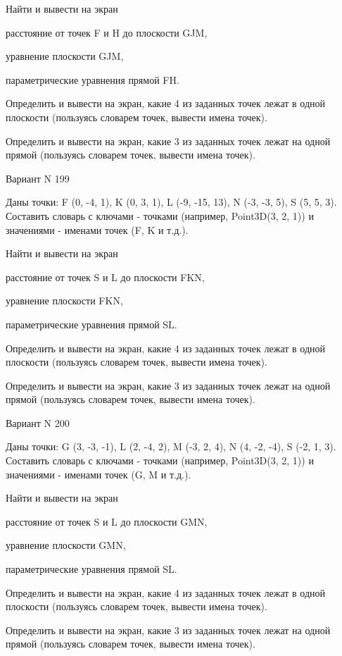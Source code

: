 \documentclass[11pt]{report}
\begin{document}
Найти и вывести на экран


расстояние от точек F и H до плоскости GJM,


уравнение плоскости GJM,


параметрические уравнения прямой FH.


Определить и вывести на экран, какие 4 из заданных точек лежат в одной плоскости (пользуясь словарем точек, вывести имена точек).


Определить и вывести на экран, какие 3 из заданных точек лежат на одной прямой (пользуясь словарем точек, вывести имена точек).

\newpage
Вариант N 199

Даны точки: F (0, -4, 1), K (0, 3, 1), L (-9, -15, 13), N (-3, -3, 5), S (5, 5, 3).
Составить словарь с ключами - точками (например, Point3D(3, 2, 1)) и значениями - именами точек (F, K и т.д.).


Найти и вывести на экран


расстояние от точек S и L до плоскости FKN,


уравнение плоскости FKN,


параметрические уравнения прямой SL.


Определить и вывести на экран, какие 4 из заданных точек лежат в одной плоскости (пользуясь словарем точек, вывести имена точек).


Определить и вывести на экран, какие 3 из заданных точек лежат на одной прямой (пользуясь словарем точек, вывести имена точек).

\newpage
Вариант N 200

Даны точки: G (3, -3, -1), L (2, -4, 2), M (-3, 2, 4), N (4, -2, -4), S (-2, 1, 3).
Составить словарь с ключами - точками (например, Point3D(3, 2, 1)) и значениями - именами точек (G, M и т.д.).


Найти и вывести на экран


расстояние от точек S и L до плоскости GMN,


уравнение плоскости GMN,


параметрические уравнения прямой SL.


Определить и вывести на экран, какие 4 из заданных точек лежат в одной плоскости (пользуясь словарем точек, вывести имена точек).


Определить и вывести на экран, какие 3 из заданных точек лежат на одной прямой (пользуясь словарем точек, вывести имена точек).

\newpage
\end{document}
